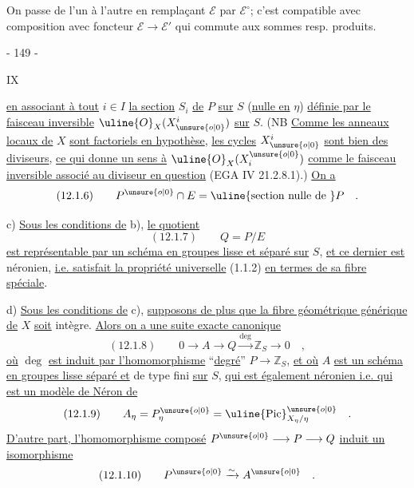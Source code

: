 On passe de l'un à l'autre en remplaçant $\mathcal E$ par $\mathcal E^\circ$; c'est compatible avec composition avec foncteur $\mathcal E\longrightarrow\mathcal E'$ qui commute aux sommes resp. produits.



\begin{center}- 149 -\end{center}
\begin{flushright}IX\end{flushright}

\uline{en associant à tout} $i\in I$ \uline{la section} $S_i$ \uline{de} $P$ \uline{sur} $S$ (\uline{nulle en} $\eta$) \uline{définie par le faisceau inversible} $\uline{O}_X(X_{\unsure{o|0}}^i)$ \uline{sur} $S$. (NB \uline{Comme les anneaux locaux de} $X$ \uline{sont factoriels en hypothèse}, \uline{les cycles} $X_{\unsure{o|0}}^i$ \uline{sont bien des diviseurs}, \uline{ce qui donne un sens à} $\uline{O}_X(X_i^{\unsure{o|0}})$ \uline{comme le faisceau inversible associé au diviseur en question} (EGA IV 21.2.8.1).) \uline{On a}
\[
(12.1.6)\qquad P^{\unsure{o|0}}\cap E=\text{\uline{section nulle de }}P\quad.
\]

c) \uline{Sous les conditions de} b), \uline{le quotient}
\[
(12.1.7)\qquad Q=P/E
\]
\uline{est représentable par un schéma en groupes lisse et séparé sur} $S$, \uline{et ce dernier est} néronien, \uline{i.e. satisfait la propriété universelle} (1.1.2) \uline{en termes de sa fibre spéciale}.

d) \uline{Sous les conditions de} c), \uline{supposons de plus que la fibre géométrique générique de} $X$ \uline{soit} intègre. \uline{Alors on a une suite exacte canonique}
\[
(12.1.8)\qquad
0\longrightarrow A\longrightarrow Q\xrightarrow{\deg}\mathbb Z_S\longrightarrow0\quad,
\]
\uline{où} $\deg$ \uline{est induit par l'homomorphisme} ``\uline{degré}'' $P\longrightarrow\mathbb Z_S$, \uline{et où} $A$ \uline{est un schéma en groupes lisse séparé et} de type fini \uline{sur} $S$, \uline{qui est également néronien i.e. qui est un modèle de Néron de}
\[
(12.1.9)\qquad A_\eta=P_\eta^{\unsure{o|0}}=\uline{\operatorname{Pic}}^{\unsure{o|0}}_{X_\eta/\eta}\quad.
\]
\uline{D'autre part, l'homomorphisme composé} $P^{\unsure{o|0}}\longrightarrow P\longrightarrow Q$ \uline{induit un isomorphisme}
\[
(12.1.10)\qquad P^{\unsure{o|0}}\xrightarrow{\sim}A^{\unsure{o|0}}\quad.
\]


